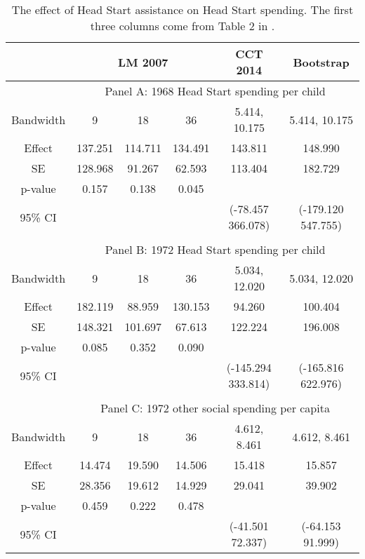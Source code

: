 \documentclass[12pt,fleqn]{article}
\begin{document}
\begin{table}[ht]
	\centering
	\begin{tabular}{cccccc}
		\toprule
		& \multicolumn{3}{c}{LM 2007} & CCT 2014 & Bootstrap \\
		\midrule
		& \multicolumn{5}{c}{Panel A: 1968 Head Start spending per child} \\
		Bandwidth & 9 & 18 & 36 & 5.414, 10.175 & 5.414, 10.175 \\
		Effect    & 137.251 & 114.711 & 134.491 & 143.811 & 148.990 \\
		SE        & 128.968 & 91.267  & 62.593 & 113.404 & 182.729 \\
		p-value   & 0.157   & 0.138   & 0.045  & & \\
		95\% CI   & & & & (-78.457 366.078) & (-179.120  547.755) \\

		&&&&& \\
		& \multicolumn{5}{c}{Panel B: 1972 Head Start spending per child} \\
		Bandwidth & 9 & 18 & 36 & 5.034, 12.020 & 5.034, 12.020 \\
		Effect    & 182.119 & 88.959 & 130.153 & 94.260 & 100.404 \\
		SE        & 148.321 & 101.697 & 67.613 & 122.224 & 196.008 \\
		p-value   & 0.085   & 0.352   & 0.090  & & \\
		95\% CI   & & & & (-145.294 333.814) & (-165.816 622.976) \\

		&&&&& \\
		& \multicolumn{5}{c}{Panel C: 1972 other social spending per capita} \\
		Bandwidth & 9 & 18 & 36 & 4.612, 8.461 & 4.612, 8.461 \\
		Effect    & 14.474 & 19.590 & 14.506 & 15.418 & 15.857 \\
		SE        & 28.356 & 19.612 & 14.929 & 29.041 & 39.902 \\
		p-value   & 0.459   & 0.222   & 0.478  & & \\
		95\% CI   & & & & (-41.501 72.337) & (-64.153 91.999) \\
		\bottomrule
	\end{tabular}
	\caption{The effect of Head Start assistance on Head Start spending. The first three columns come from Table 2 in \cite{ludwig2007}.}
	\label{tab: head start spending}
\end{table}
\end{document}
